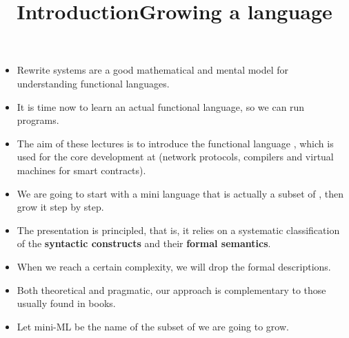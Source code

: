 \documentclass[wide]{slides}
\begin{document}
\maketitle

\begin{slide}
  \title{Introduction}

  \begin{itemize}

    \item Rewrite systems are a good mathematical and mental model for
      understanding functional languages.

    \item It is time now to learn an actual functional language, so we
      can run programs.

    \item The aim of these lectures is to introduce the functional
      language \OCaml, which is used for the core development at
      \Tezos (network protocols, compilers and virtual machines for
      smart contracts).



    \item We are going to start with a mini language that is actually
      a subset of \OCaml, then grow it step by step.

  \end{itemize}

\end{slide}

\begin{slide}
  \title{Growing a language}

  \begin{itemize}

    \item The presentation is principled, that is, it relies on a
      systematic classification of the \textbf{syntactic constructs}
      and their \textbf{formal semantics}.

    \item When we reach a certain complexity, we will drop the formal
      descriptions.

    \item Both theoretical and pragmatic, our approach is
      complementary to those usually found in books.


    \item Let mini-ML be the name of the subset of \OCaml we are going
      to grow.

  \end{itemize}
\end{slide}
\end{document}
